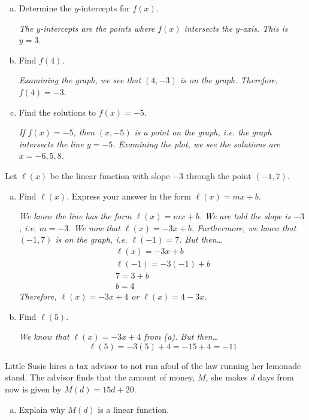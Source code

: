 \documentclass[12pt,letterpaper]{exam}
\begin{document}
\begin{questions}
\begin{enumerate}[(a)]
\item Determine the $y$-intercepts for $f(x)$. \pvspace{0.7cm}

{\itshape The $y$-intercepts are the points where $f(x)$ intersects the $y$-axis. This is $y= 3$.} \pvspace{0.7cm}

\item Find $f(4)$. \pvspace{0.7cm}

{\itshape Examining the graph, we see that $(4, -3)$ is on the graph. Therefore, $f(4)= -3$.} \pvspace{0.7cm}

\item Find the solutions to $f(x)= -5$. \pvspace{0.7cm}

{\itshape If $f(x)= -5$, then $(x, -5)$ is a point on the graph, i.e. the graph intersects the line $y= -5$. Examining the plot, we see the solutions are $x= -6, 5, 8$.}
\end{enumerate}



\newpage
\question[15] Let $\ell(x)$ be the linear function with slope $-3$ through the point $(-1, 7)$. 
	\begin{enumerate}[(a)]
	\item Find $\ell(x)$. Express your answer in the form $\ell(x)= mx + b$. \pvspace{0.5cm}
	
	{\itshape We know the line has the form $\ell(x)= mx + b$. We are told the slope is $-3$, i.e. $m= -3$. We now that $\ell(x)= -3x + b$. Furthermore, we know that $(-1, 7)$ is on the graph, i.e. $\ell(-1)= 7$. But then\dots
		\[
		\begin{gathered}
		\ell(x)= -3x + b \\
		\ell(-1)= -3(-1) + b \\
		7= 3 + b \\
		b= 4
		\end{gathered}
		\]
	Therefore, $\ell(x)= -3x + 4$ or $\ell(x)= 4 - 3x$.
	} \pvspace{4.55cm}

	\item Find $\ell(5)$. \pvspace{0.5cm}
	
	{\itshape We know that $\ell(x)= -3x + 4$ from (a). But then\dots
		\[
		\ell(5)= -3(5) + 4= -15 + 4= -11
		\]
	}
	\end{enumerate}



\newpage
\question[15] Little Susie hires a tax advisor to not run afoul of the law running her lemonade stand. The advisor finds that the amount of money, $M$, she makes $d$ days from now is given by $M(d)= 15d + 20$.
	\begin{enumerate}[(a)]
	\item Explain why $M(d)$ is a linear function. \pvspace{2.6cm}
	

\end{enumerate}
\end{questions}
\end{document}

